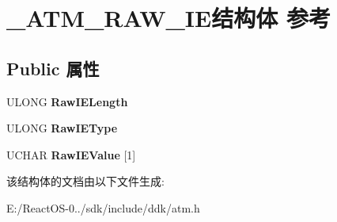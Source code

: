 \hypertarget{struct___a_t_m___r_a_w___i_e}{}\section{\+\_\+\+A\+T\+M\+\_\+\+R\+A\+W\+\_\+\+I\+E结构体 参考}
\label{struct___a_t_m___r_a_w___i_e}
\subsection*{Public 属性}
\begin{DoxyCompactItemize}
\item 
\mbox{\label{struct___a_t_m___r_a_w___i_e_a7af46c293f7b4d188d329743eebc7763}} 
U\+L\+O\+NG {\bfseries Raw\+I\+E\+Length}
\item 
\mbox{\label{struct___a_t_m___r_a_w___i_e_ac8f229b617995a8494cbbef23b004d5e}} 
U\+L\+O\+NG {\bfseries Raw\+I\+E\+Type}
\item 
\mbox{\label{struct___a_t_m___r_a_w___i_e_a3620a04a87c8364601b4af4a22c21b9a}} 
U\+C\+H\+AR {\bfseries Raw\+I\+E\+Value} \mbox{[}1\mbox{]}
\end{DoxyCompactItemize}


该结构体的文档由以下文件生成\+:\begin{DoxyCompactItemize}
\item 
E\+:/\+React\+O\+S-\/0../sdk/include/ddk/atm.\+h\end{DoxyCompactItemize}

